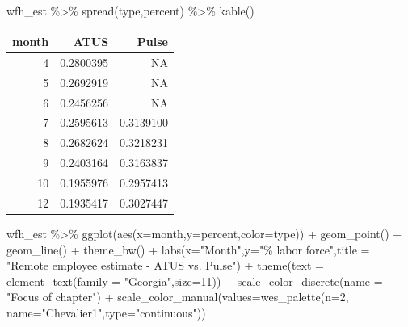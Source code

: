 \documentclass[
]{article}
\newenvironment{Shaded}{\begin{snugshade}}{\end{snugshade}}
\newcommand{\AttributeTok}[1]{\textcolor[rgb]{0.77,0.63,0.00}{#1}}
\newcommand{\DecValTok}[1]{\textcolor[rgb]{0.00,0.00,0.81}{#1}}
\newcommand{\FunctionTok}[1]{\textcolor[rgb]{0.00,0.00,0.00}{#1}}
\newcommand{\NormalTok}[1]{#1}
\newcommand{\SpecialCharTok}[1]{\textcolor[rgb]{0.00,0.00,0.00}{#1}}
\newcommand{\StringTok}[1]{\textcolor[rgb]{0.31,0.60,0.02}{#1}}
\begin{document}
\begin{Shaded}
\begin{Highlighting}[]
\NormalTok{wfh\_est }\SpecialCharTok{\%\textgreater{}\%}
  \FunctionTok{spread}\NormalTok{(type,percent) }\SpecialCharTok{\%\textgreater{}\%}
  \FunctionTok{kable}\NormalTok{()}
\end{Highlighting}
\end{Shaded}

\begin{tabular}{r|r|r}
\hline
month & ATUS & Pulse\\
\hline
4 & 0.2800395 & NA\\
\hline
5 & 0.2692919 & NA\\
\hline
6 & 0.2456256 & NA\\
\hline
7 & 0.2595613 & 0.3139100\\
\hline
8 & 0.2682624 & 0.3218231\\
\hline
9 & 0.2403164 & 0.3163837\\
\hline
10 & 0.1955976 & 0.2957413\\
\hline
12 & 0.1935417 & 0.3027447\\
\hline
\end{tabular}

\begin{Shaded}
\begin{Highlighting}[]
\NormalTok{wfh\_est }\SpecialCharTok{\%\textgreater{}\%}
  \FunctionTok{ggplot}\NormalTok{(}\FunctionTok{aes}\NormalTok{(}\AttributeTok{x=}\NormalTok{month,}\AttributeTok{y=}\NormalTok{percent,}\AttributeTok{color=}\NormalTok{type)) }\SpecialCharTok{+} 
  \FunctionTok{geom\_point}\NormalTok{() }\SpecialCharTok{+} 
  \FunctionTok{geom\_line}\NormalTok{() }\SpecialCharTok{+} 
  \FunctionTok{theme\_bw}\NormalTok{() }\SpecialCharTok{+} 
  \FunctionTok{labs}\NormalTok{(}\AttributeTok{x=}\StringTok{"Month"}\NormalTok{,}\AttributeTok{y=}\StringTok{"\% labor force"}\NormalTok{,}\AttributeTok{title =} \StringTok{"Remote employee estimate {-} ATUS vs. Pulse"}\NormalTok{) }\SpecialCharTok{+} 
  \FunctionTok{theme}\NormalTok{(}\AttributeTok{text =} \FunctionTok{element\_text}\NormalTok{(}\AttributeTok{family =} \StringTok{"Georgia"}\NormalTok{,}\AttributeTok{size=}\DecValTok{11}\NormalTok{)) }\SpecialCharTok{+} 
  \FunctionTok{scale\_color\_discrete}\NormalTok{(}\AttributeTok{name =} \StringTok{"Focus of chapter"}\NormalTok{) }\SpecialCharTok{+}
  \FunctionTok{scale\_color\_manual}\NormalTok{(}\AttributeTok{values=}\FunctionTok{wes\_palette}\NormalTok{(}\AttributeTok{n=}\DecValTok{2}\NormalTok{, }\AttributeTok{name=}\StringTok{"Chevalier1"}\NormalTok{,}\AttributeTok{type=}\StringTok{"continuous"}\NormalTok{))}
\end{Highlighting}
\end{Shaded}
\end{document}
